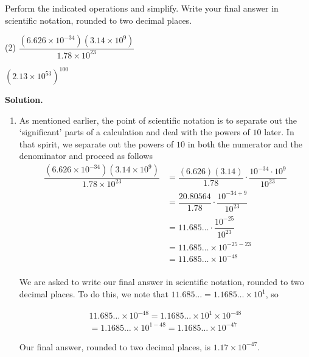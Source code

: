 \begin{ex} \label{scientificnotationex} Perform the indicated operations and simplify.  Write your final answer in scientific notation, rounded to two decimal places.

\begin{tasks}(2)
\task  $\dfrac{\left(6.626 \times 10^{-34} \right) \left(3.14 \times 10^{9}\right)}{1.78 \times 10^{23}}$

\task  $\left(2.13 \times 10^{53}\right)^{100}$

\end{tasks}

{\bf Solution.}

\begin{enumerate}

\item  As mentioned earlier, the point of scientific notation is to separate out the `significant' parts of a calculation and deal with the powers of $10$ later.  In that spirit, we separate out the powers of $10$ in both the numerator and the denominator and proceed as follows
\begin{align*}
\dfrac{\left(6.626 \times 10^{-34} \right) \left(3.14 \times 10^{9}\right)}{1.78 \times 10^{23}} &=  \dfrac{(6.626)(3.14)}{1.78} \cdot \dfrac{10^{-34} \cdot 10^{9}}{10^{23}} \\
 &=  \dfrac{20.80564}{1.78} \cdot \dfrac{10^{-34 + 9}}{10^{23}} \\
 &=  11.685 \ldots \cdot \dfrac{10^{-25}}{10^{23}} \\
 &=  11.685 \ldots \times 10^{-25-23} \\
 &=  11.685 \ldots \times 10^{-48} \\
\end{align*}

We are asked to write our final answer in scientific notation, rounded to two decimal places.  To do this, we note that  $11.685 \ldots = 1.1685 \ldots \times 10^{1}$, so

\begin{multline*}
11.685 \ldots \times 10^{-48} = 1.1685 \ldots \times 10^{1} \times 10^{-48} \\
= 1.1685 \ldots \times 10^{1-48} = 1.1685 \ldots \times 10^{-47} 
\end{multline*}

Our final answer, rounded to two decimal places, is $1.17 \times 10^{-47}$.  


\end{enumerate}
\end{ex}
